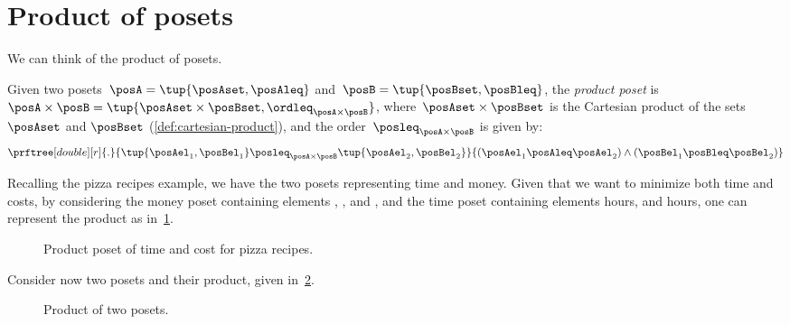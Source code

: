 
\section{Product of posets}
We can think of the product of posets.

\begin{definition}
    \label{def:productposet}
    Given two posets~$\posA=\tup{\posAset, \posAleq}$
    and~$\posB=\tup{\posBset, \posBleq}$, the \emph{product poset} is~$\posA\times \posB=\tup{\posAset \times \posBset, \ordleq_{\posA\times \posB}}$, where~$\posAset \times \posBset$ is the Cartesian product of the sets~$\posAset$ and $\posBset$ (\cref{def:cartesian-product}), and the order~$\posleq_{\posA \times \posB}$ is given by:
    \begin{equation}
        \prftree[double][r]{.}{\tup{\posAel_1, \posBel_1}
            \posleq_{\posA\times \posB}
            \tup{\posAel_2, \posBel_2}}{(\posAel_1 \posAleq \posAel_2) \wedge
            (\posBel_1 \posBleq \posBel_2)}
    \end{equation}
\end{definition}
Recalling the pizza recipes example, we have the two posets representing time and money.
Given that we want to minimize both time and costs, by considering the money poset containing elements \unit[10]{\CHF}, \unit[20]{\CHF}, and \unit[30]{\CHF}, and the time poset containing elements \unit[1]{hours}, and \unit[2]{hours}, one can represent the product as in~\cref{fig:productpizza}.

\begin{figure}[h!]
    \centering
    \caption{Product poset of time and cost for pizza recipes.}
    \label{fig:productpizza}
\end{figure}

\begin{example}
    Consider now two posets and their product, given in~\cref{fig:composing_posets_1}.
    \begin{figure}[h!]
        \centering
        \caption{Product of two posets.}
        \label{fig:composing_posets_1}
    \end{figure}
\end{example}
